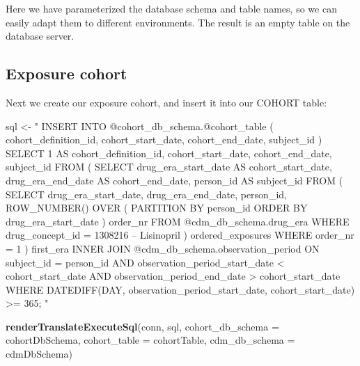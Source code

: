 \documentclass[11pt]{book}
\newenvironment{Shaded}{\begin{snugshade}}{\end{snugshade}}
\newcommand{\DataTypeTok}[1]{\textcolor[rgb]{0.13,0.29,0.53}{#1}}
\newcommand{\KeywordTok}[1]{\textcolor[rgb]{0.13,0.29,0.53}{\textbf{#1}}}
\newcommand{\NormalTok}[1]{#1}
\newcommand{\StringTok}[1]{\textcolor[rgb]{0.31,0.60,0.02}{#1}}
\theoremstyle{definition}
\theoremstyle{definition}
\theoremstyle{definition}
\theoremstyle{remark}
\begin{document}
Here we have parameterized the database schema and table names, so we can easily adapt them to different environments. The result is an empty table on the database server.

\hypertarget{exposure-cohort}{%
\subsection{Exposure cohort}\label{exposure-cohort}}

Next we create our exposure cohort, and insert it into our COHORT table:

\begin{Shaded}
\begin{Highlighting}[]
\NormalTok{sql <-}\StringTok{ "}
\StringTok{INSERT INTO @cohort_db_schema.@cohort_table (}
\StringTok{  cohort_definition_id,}
\StringTok{  cohort_start_date,}
\StringTok{  cohort_end_date,}
\StringTok{  subject_id}
\StringTok{)}
\StringTok{SELECT 1 AS cohort_definition_id,}
\StringTok{  cohort_start_date,}
\StringTok{  cohort_end_date,}
\StringTok{  subject_id}
\StringTok{FROM (}
\StringTok{  SELECT drug_era_start_date AS cohort_start_date,}
\StringTok{    drug_era_end_date AS cohort_end_date,}
\StringTok{    person_id AS subject_id}
\StringTok{  FROM (}
\StringTok{    SELECT drug_era_start_date,}
\StringTok{      drug_era_end_date,}
\StringTok{      person_id,}
\StringTok{      ROW_NUMBER() OVER (}
\StringTok{        PARTITION BY person_id}
\StringTok{            ORDER BY drug_era_start_date}
\StringTok{      ) order_nr}
\StringTok{    FROM @cdm_db_schema.drug_era}
\StringTok{    WHERE drug_concept_id = 1308216 -- Lisinopril}
\StringTok{  ) ordered_exposures}
\StringTok{  WHERE order_nr = 1}
\StringTok{) first_era}
\StringTok{INNER JOIN @cdm_db_schema.observation_period}
\StringTok{  ON subject_id = person_id}
\StringTok{    AND observation_period_start_date < cohort_start_date}
\StringTok{    AND observation_period_end_date > cohort_start_date}
\StringTok{WHERE DATEDIFF(DAY,}
\StringTok{               observation_period_start_date,}
\StringTok{               cohort_start_date) >= 365;}
\StringTok{"}

\KeywordTok{renderTranslateExecuteSql}\NormalTok{(conn, sql,}
                          \DataTypeTok{cohort_db_schema =}\NormalTok{ cohortDbSchema,}
                          \DataTypeTok{cohort_table =}\NormalTok{ cohortTable,}
                          \DataTypeTok{cdm_db_schema =}\NormalTok{ cdmDbSchema)}
\end{Highlighting}
\end{Shaded}
\end{document}
